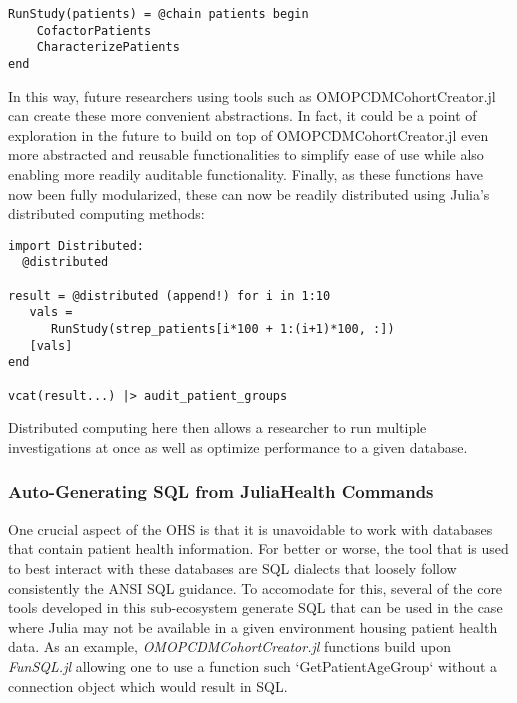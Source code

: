 \documentclass{juliacon}
\begin{document}
\begin{verbatim}
RunStudy(patients) = @chain patients begin
    CofactorPatients
    CharacterizePatients
end
\end{verbatim}

In this way, future researchers using tools such as OMOPCDMCohortCreator.jl can create these more convenient abstractions.
In fact, it could be a point of exploration in the future to build on top of OMOPCDMCohortCreator.jl even more abstracted and reusable functionalities to simplify ease of use while also enabling more readily auditable functionality.
Finally, as these functions have now been fully modularized, these can now be readily distributed using Julia's distributed computing methods:

\begin{verbatim}
import Distributed:
  @distributed 

result = @distributed (append!) for i in 1:10
   vals = 
      RunStudy(strep_patients[i*100 + 1:(i+1)*100, :])
   [vals]
end

vcat(result...) |> audit_patient_groups
\end{verbatim}

Distributed computing here then allows a researcher to run multiple investigations at once as well as optimize performance to a given database.


\subsubsection{Auto-Generating SQL from JuliaHealth Commands}

One crucial aspect of the OHS is that it is unavoidable to work with databases that contain patient health information.
For better or worse, the tool that is used to best interact with these databases are SQL dialects that loosely follow consistently the ANSI SQL guidance.
To accomodate for this, several of the core tools developed in this sub-ecosystem generate SQL that can be used in the case where Julia may not be available in a given environment housing patient health data.
As an example, \textit{OMOPCDMCohortCreator.jl} functions build upon \textit{FunSQL.jl} allowing one to use a function such `GetPatientAgeGroup` without a connection object which would result in SQL.
\end{document}

